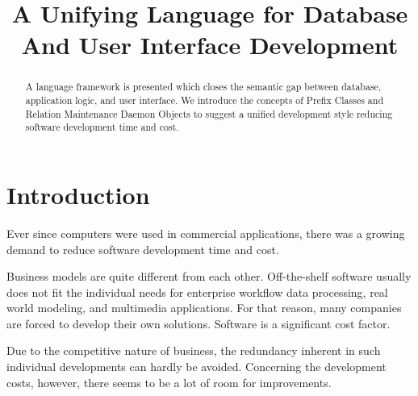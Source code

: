 \title{A Unifying Language for Database And User Interface Development}

\maketitle







\begin{abstract}
A language framework is presented which closes the semantic gap between
database, application logic, and user interface. We introduce the
concepts of Prefix Classes and Relation Maintenance Daemon Objects to
suggest a unified development style reducing software development time
and cost.
\end{abstract}

 
\section{Introduction}
\label{sec:ul-intro}

Ever since computers were used in commercial applications, there was a
growing demand to reduce software development time and cost.

Business models are quite different from each other. Off-the-shelf
software usually does not fit the individual needs for enterprise
workflow data processing, real world modeling, and multimedia
applications. For that reason, many companies are forced to develop
their own solutions. Software is a significant cost factor.

Due to the competitive nature of business, the redundancy inherent in
such individual developments can hardly be avoided. Concerning the
development costs, however, there seems to be a lot of room for
improvements.

